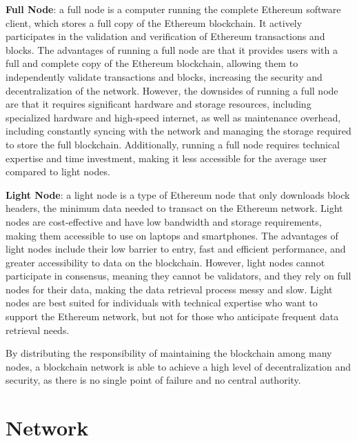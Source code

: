 \documentclass[target=mst,aauheader=]{thud}
\begin{document}
    \textbf{Full Node}: a full node is a computer running the complete Ethereum software client, which stores a full copy of the Ethereum blockchain. It actively participates in the validation and verification of Ethereum transactions and blocks. The advantages of running a full node are that it provides users with a full and complete copy of the Ethereum blockchain, allowing them to independently validate transactions and blocks, increasing the security and decentralization of the network. However, the downsides of running a full node are that it requires significant hardware and storage resources, including specialized hardware and high-speed internet, as well as maintenance overhead, including constantly syncing with the network and managing the storage required to store the full blockchain. Additionally, running a full node requires technical expertise and time investment, making it less accessible for the average user compared to light nodes.

    \textbf{Light Node}: a light node is a type of Ethereum node that only downloads block headers, the minimum data needed to transact on the Ethereum network. Light nodes are cost-effective and have low bandwidth and storage requirements, making them accessible to use on laptops and smartphones. The advantages of light nodes include their low barrier to entry, fast and efficient performance, and greater accessibility to data on the blockchain. However, light nodes cannot participate in consensus, meaning they cannot be validators, and they rely on full nodes for their data, making the data retrieval process messy and slow. Light nodes are best suited for individuals with technical expertise who want to support the Ethereum network, but not for those who anticipate frequent data retrieval needs.
            
    By distributing the responsibility of maintaining the blockchain among many nodes, a blockchain network is able to achieve a high level of decentralization and security, as there is no single point of failure and no central authority.
    
    \section{Network}
    
\end{document}
